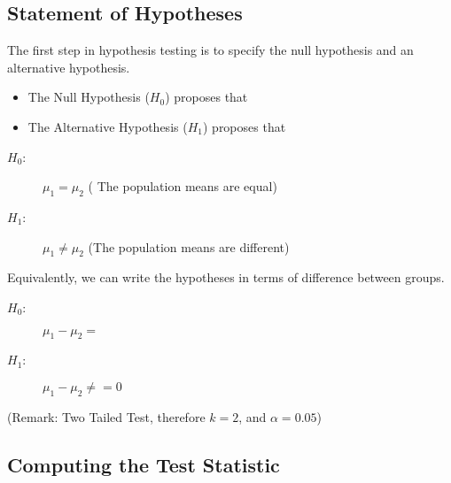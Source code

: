 \documentclass[a4paper,12pt]{article}
\begin{document}
\subsection*{Statement of Hypotheses}
\noindent The first step in hypothesis testing is to specify the null hypothesis and an alternative hypothesis.
\begin{itemize}
    \item The Null Hypothesis ($H_0$) proposes that
    \item The Alternative Hypothesis ($H_1$) proposes that
\end{itemize}
\begin{description}
\item[$H_0$:] $\mu_1 = \mu_2$ ( The population means are equal)
\item[$H_1$:] $\mu_1 \neq \mu_2$ (The population means are different)
\end{description}

\noindent Equivalently, we can write the hypotheses in terms of difference between groups.
\begin{description}
\item[$H_0$:] $\mu_1 - \mu_2 = $ 
\item[$H_1$:] $\mu_1 - \mu_2\neq  = 0$ 
\end{description}



\noindent (Remark: Two Tailed Test, therefore $k = 2$, and $\alpha = 0.05$)
\newpage
\subsection*{Computing the Test Statistic}
\end{document}
